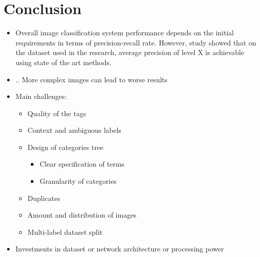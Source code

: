 \chapter{Conclusion}
\label{chap:conclusion}


\begin{itemize}
    \item Overall image classification system performance depends on the initial requirements in terms of precision-recall rate. However, study showed that on the dataset used in the research, average precision of level X is achievable using state of the art methods.
    \item .. More complex images can lead to worse results
    \item Main challenges:
    \begin{itemize}
        \item Quality of the tags
        \item Context and ambiguous labels
        \item Design of categories tree
        \begin{itemize}
            \item Clear specification of terms
            \item Granularity of categories
        \end{itemize}
        \item Duplicates
        \item Amount and distribution of images
        \item Multi-label dataset split
    \end{itemize}
    \item Investments in dataset or network architecture or processing power
\end{itemize}